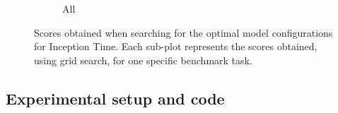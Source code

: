 \begin{figure}[hp]
\begin{subfigure}[b]{0.45\textwidth}
        \caption{All}
        \label{fig:gridsearch_all}
     \end{subfigure}
    \caption{Scores obtained when searching for the optimal model configurations for Inception Time. Each sub-plot represents the scores obtained, using grid search, for one specific benchmark task. %
    }
    \label{fig:gridsearch_violin}
\end{figure}






\subsection{Experimental setup and code}

